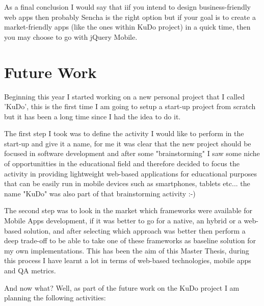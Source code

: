 \documentclass[a4paper,12pt]{book}
\begin{document}
As a final conclusion I would say that iif you intend to design business-friendly web apps then probably Sencha is the right option but if your goal is to create a market-friendly apps (like the ones within KuDo project) in a quick time, then you may choose to go with jQuery Mobile.


\chapter{Future Work}
\label{chap:future}

Beginning this year I started working on a new personal project that I called 'KuDo', this is the first time I am going to setup a start-up project from scratch but it has been a long time since I had the idea to do it. 

The first step I took was to define the activity I would like to perform in the start-up  and give it a name, for me it was clear that the new project should be focused in software development and after some "brainstorming" I saw some niche of opportunitties in the educational field and therefore decided to focus the activity in providing lightweight web-based applications for educational purposes that can be easily run in mobile devices such as smartphones, tablets etc... the name "KuDo" was also part of that brainstorming activity :-)

The second step was to look in the market which frameworks were available for Mobile Apps development, if it was better to go for a native, an hybrid or a web-based solution, and after selecting which approach was better then perform a deep trade-off to be able to take one of these frameworks as baseline solution for my own implementations. This has been the aim of this Master Thesis, during this process I have learnt a lot in terms of web-based technologies, mobile apps and QA metrics.

And now what? Well, as part of the future work on the KuDo project I am planning the following activities:
\end{document}
